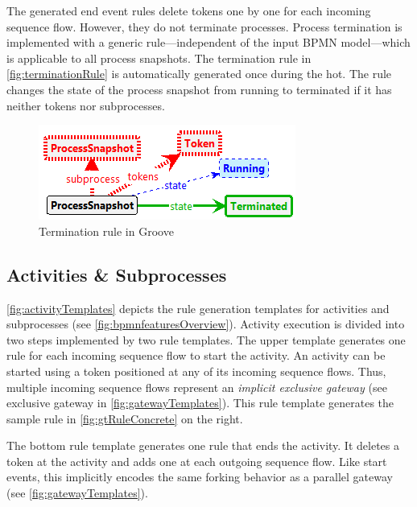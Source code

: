\documentclass[runningheads]{llncs}
\begin{document}
The generated end event rules delete tokens one by one for each incoming sequence flow.
However, they do not terminate processes.
Process termination is implemented with a generic rule---independent of the input BPMN model---which is applicable to all process snapshots.
The termination rule in \autoref{fig:terminationRule} is automatically generated once during the \gls*{hot}.
The rule changes the state of the process snapshot from running to terminated if it has neither tokens nor subprocesses.

\begin{figure}[ht]
    \centering
    \includegraphics[width=.5\textwidth]{images/terminate_groove.png}
    \caption{Termination rule in Groove}
    \label{fig:terminationRule}
\end{figure}

\subsection{Activities \& Subprocesses}

\autoref{fig:activityTemplates} depicts the rule generation templates for activities and subprocesses (see \autoref{fig:bpmnfeaturesOverview}).
Activity execution is divided into two steps implemented by two rule templates.
The upper template generates one rule for each incoming sequence flow to start the activity.
An activity can be started using a token positioned at any of its incoming sequence flows.
Thus, multiple incoming sequence flows represent an \textit{implicit exclusive gateway} (see exclusive gateway in \autoref{fig:gatewayTemplates}).
This rule template generates the sample rule in \autoref{fig:gtRuleConcrete} on the right.

The bottom rule template generates one rule that ends the activity.
It deletes a token at the activity and adds one at each outgoing sequence flow.
Like start events, this implicitly encodes the same forking behavior as a parallel gateway (see \autoref{fig:gatewayTemplates}). 
\end{document}
